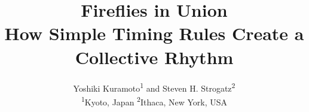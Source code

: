 \documentclass{article}
\begin{document}
\title{\textcolor{customblue}{\bfseries Fireflies in Union}\\
    \normalsize How Simple Timing Rules Create a Collective Rhythm}

\author{Yoshiki Kuramoto\textsuperscript{1} and Steven H. Strogatz\textsuperscript{2}\\
\small \textsuperscript{1}Kyoto, Japan \quad \textsuperscript{2}Ithaca, New York, USA
}


\date{}
\maketitle










\printbibliography
\end{document}
